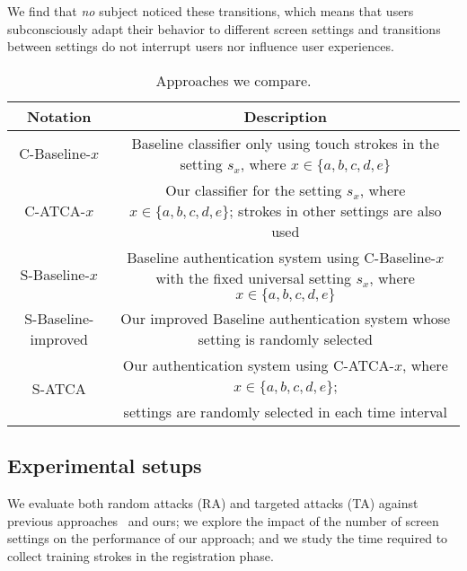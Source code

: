 \documentclass{sig-alternate-05-2015}
\begin{document}
We find that \emph{no} subject noticed these transitions, which means that 
users  subconsciously adapt their behavior to different screen settings and 
transitions between settings do not interrupt users nor influence user
experiences. 







\begin{table*}[!t]\renewcommand{\arraystretch}{1.1}
\centering
\caption{Approaches we compare.}
\addtolength{\tabcolsep}{-5pt}
\begin{tabular}{|c|c|} \hline
{\small Notation} & {\small Description} \\ \hline
{\small C-Baseline-$x$} & {\small Baseline classifier only using touch strokes in the setting $s_x$, where $x\in \{a,b,c,d,e\}$} \\ \hline
{\small C-ATCA-$x$} & {\small Our classifier for the setting $s_x$, where $x\in \{a,b,c,d,e\}$; strokes in other settings are also used} \\ \hline
{\small S-Baseline-$x$} & {\small Baseline authentication system using C-Baseline-$x$ with the fixed universal setting $s_x$, where $x\in \{a,b,c,d,e\}$ }\\ \hline
{\small S-Baseline-improved} & {\small Our improved Baseline authentication system whose setting is randomly selected} \\ \hline
\multirow{2}{*}{{\small S-ATCA}} &{\small  Our authentication system using C-ATCA-$x$, where $x\in \{a,b,c,d,e\}$;}\\ 
&{\small  settings are randomly selected in each time interval} \\ \hline
\end{tabular}
\label{approach}
\end{table*}















\subsection{Experimental setups} 
We evaluate both random attacks (RA) and targeted attacks (TA) against previous
approaches~\cite{frank2013touchalytics,li2013unobservable,attack-CCS13} and
ours; we explore the impact of the number of screen settings on the performance of our approach; 
and  we study the time required to collect training strokes in the registration phase.
\end{document}
